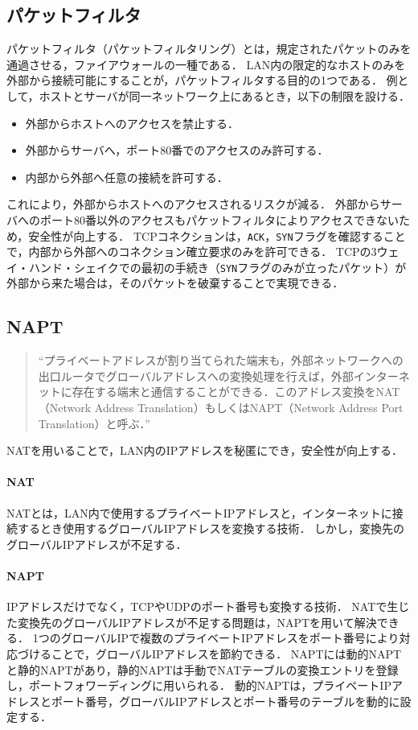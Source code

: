 \subsection{パケットフィルタ}
パケットフィルタ（パケットフィルタリング）とは，規定されたパケットのみを通過させる，ファイアウォールの一種である．
LAN内の限定的なホストのみを外部から接続可能にすることが，パケットフィルタする目的の1つである．
例として，ホストとサーバが同一ネットワーク上にあるとき，以下の制限を設ける．
\begin{itemize}
    \item 外部からホストへのアクセスを禁止する．
    \item 外部からサーバへ，ポート80番でのアクセスのみ許可する．
    \item 内部から外部へ任意の接続を許可する．
\end{itemize}
これにより，外部からホストへのアクセスされるリスクが減る．
外部からサーバへのポート80番以外のアクセスもパケットフィルタによりアクセスできないため，安全性が向上する．
TCPコネクションは，\texttt{ACK}，\texttt{SYN}フラグを確認することで，内部から外部へのコネクション確立要求のみを許可できる．
TCPの3ウェイ・ハンド・シェイクでの最初の手続き（\texttt{SYN}フラグのみが立ったパケット）が外部から来た場合は，そのパケットを破棄することで実現できる\cite[p.343]{マスタリングTCPIP}．
\subsection{NAPT}
\begin{quote}
    ``プライベートアドレスが割り当てられた端末も，外部ネットワークへの出口ルータでグローバルアドレスへの変換処理を行えば，外部インターネットに存在する端末と通信することができる．このアドレス変換をNAT（Network Address Translation）もしくはNAPT（Network Address Port Translation）と呼ぶ．''\hfill\cite[p.97]{情報通信ネットワーク}
\end{quote}
NATを用いることで，LAN内のIPアドレスを秘匿にでき，安全性が向上する．
\paragraph{NAT}
NATとは，LAN内で使用するプライベートIPアドレスと，インターネットに接続するとき使用するグローバルIPアドレスを変換する技術．
しかし，変換先のグローバルIPアドレスが不足する．
\paragraph{NAPT}
IPアドレスだけでなく，TCPやUDPのポート番号も変換する技術．
NATで生じた変換先のグローバルIPアドレスが不足する問題は，NAPTを用いて解決できる．
1つのグローバルIPで複数のプライベートIPアドレスをポート番号により対応づけることで，グローバルIPアドレスを節約できる．
NAPTには動的NAPTと静的NAPTがあり，静的NAPTは手動でNATテーブルの変換エントリを登録し，ポートフォワーディングに用いられる．
動的NAPTは，プライベートIPアドレスとポート番号，グローバルIPアドレスとポート番号のテーブルを動的に設定する．
